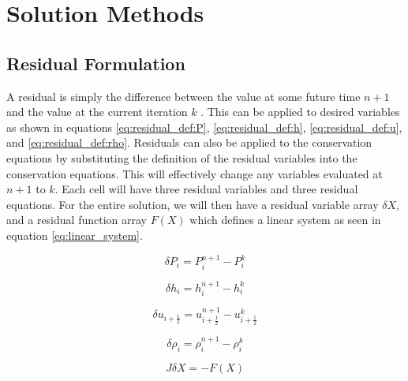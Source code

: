 \vspace*{-80mm}
\chapter{Solution Methods}
\label{chapter3:Solution Methods}

	\section{Residual Formulation}
	    
    A residual is simply the difference between the value at some future time
    $n+1$ and the value at the current iteration $k$ \cite{kelly1995}. This can
    be applied to desired variables as shown in equations
    \eqref{eq:residual_def:P}, \eqref{eq:residual_def:h},
    \eqref{eq:residual_def:u}, and \eqref{eq:residual_def:rho}. Residuals can
    also be applied to the conservation equations by substituting the definition
    of the residual variables into the conservation equations. This will
    effectively change any variables evaluated at $n+1$ to $k$. Each cell will
    have three residual variables and three residual equations. For the entire
    solution, we will then have a residual variable array $\delta X$, and a
    residual function array $F(X)$ which defines a linear system as seen in 
    equation \eqref{eq:linear_system}.
        
    \begin{equation}
    	\label{eq:residual_def:P}
    	\delta P_{i} = P^{n+1}_{i} - P^{k}_{i}
    \end{equation}
    
    \begin{equation}
    	\label{eq:residual_def:h}
    	\delta h_{i} = h^{n+1}_{i} - h^{k}_{i}
    \end{equation}
    
    \begin{equation}
    	\label{eq:residual_def:u}
    	\delta u_{i+\frac{1}{2}} = u^{n+1}_{i+\frac{1}{2}} - u^{k}_{i+\frac{1}{2}}
    \end{equation}
    
    \begin{equation}
    	\label{eq:residual_def:rho}
    	\delta \rho_{i} = \rho^{n+1}_{i} - \rho^{k}_{i}
    \end{equation}
    
    \begin{equation}
    	\label{eq:linear_system}
    	J \delta X = - F(X)
    \end{equation}
    

